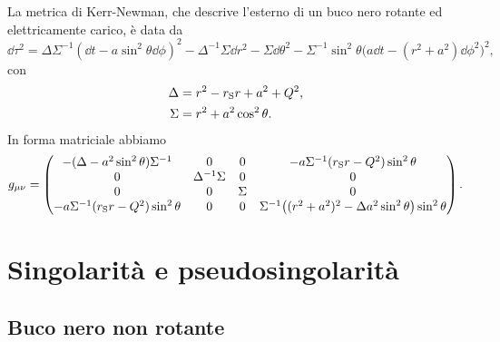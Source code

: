 La metrica di Kerr-Newman, che descrive l'esterno di un buco nero rotante ed
elettricamente carico, è data da
\begin{equation}
  \label{eq:metrica-kerr-newman}
  \dd\tau^{2} = \Delta\Sigma^{-1}(\dd t - a\sin^{2}\theta\dd\phi)^{2} -
  \Delta^{-1}\Sigma\dd r^{2} - \Sigma\dd\theta^{2} -
  \Sigma^{-1}\sin^{2}\theta\bigl(a\dd t - (r^{2} + a^{2})\dd\phi^{2}\bigr)^{2},
\end{equation}
con
\begin{subequations}
  \begin{align}
    \Delta &= r^{2} - r_{\textup{S}}r + a^{2} + Q^{2}, \\
    \Sigma &= r^{2} + a^{2}\cos^{2}\theta.
  \end{align}
\end{subequations}
In forma matriciale abbiamo
\begin{equation}
  g_{\mu\nu} =
  \begin{pmatrix}
    -(\Delta - a^{2}\sin^{2}\theta)\Sigma^{-1} & 0 & 0 &
    -a\Sigma^{-1}(r_{\textup{S}}r - Q^{2})\sin^{2}\theta \\
    0 & \Delta^{-1}\Sigma & 0 & 0 \\
    0 & 0 & \Sigma & 0 \\
    -a\Sigma^{-1}(r_{\textup{S}}r - Q^{2})\sin^{2}\theta & 0 & 0 &
    \Sigma^{-1}\bigl((r^{2} + a^{2})^{2} - \Delta
    a^{2}\sin^{2}\theta\bigr)\sin^{2}\theta
  \end{pmatrix}.
\end{equation}

\section{Singolarità e pseudosingolarità}
\label{sec:singolarita}

\subsection{Buco nero non rotante}
\label{sec:singolarita-schwarzschild}

